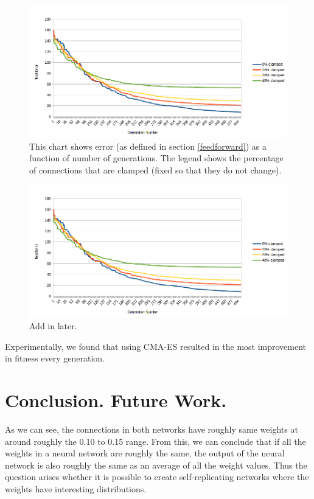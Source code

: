 \documentclass[12pt]{article}
\begin{document}
\begin{figure}[h]
\begin{center}
  \includegraphics[width=1.0\linewidth]{result1.png}
\end{center}
   \caption{This chart shows error (as defined in section \ref{feedforward}) as a function of number of generations. The legend shows the percentage of connections that are clamped (fixed so that they do not change).}
\label{result1}
\end{figure}

\begin{figure}[h]
\begin{center}
  \includegraphics[width=1.0\linewidth]{result1.png}
\end{center}
   \caption{Add in later.}
\label{histogram}
\end{figure}

Experimentally, we found that using CMA-ES resulted in the most improvement in fitness every generation.

\section{Conclusion. Future Work.}
\label{conclusion}

As we can see, the connections in both networks
have roughly same weights
at around roughly the 0.10 to 0.15 range.
From this, we can conclude that
if all the weights in a neural network are roughly the same,
the output of the neural network
is also roughly the same as an average
of all the weight values.
Thus the question arises whether it is
possible to create self-replicating networks
where the weights have interesting distributions. 

\renewcommand{\refname}{\section{References}}


\end{document}
